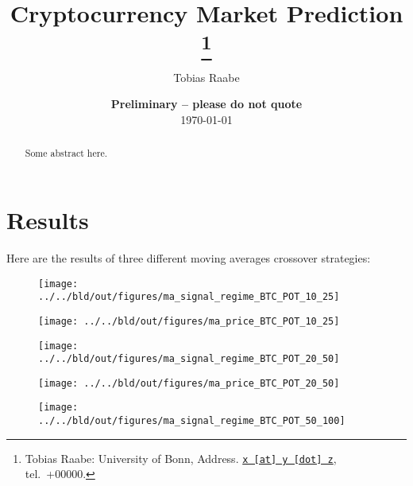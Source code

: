 \documentclass[11pt, a4paper, leqno]{article}
\begin{document}
\title{Cryptocurrency Market Prediction
\thanks{Tobias Raabe: University of Bonn, Address. \href{mailto:x@y.z} {\nolinkurl{x [at] y [dot] z}}, tel.~+00000.}
}

\author{Tobias Raabe
}

\date{
{\bf Preliminary -- please do not quote}
\\[1ex]
\today
}

\maketitle


\begin{abstract}
	Some abstract here.
\end{abstract}
\clearpage

\section{Results} %
\label{sec:results}

Here are the results of three different moving averages crossover strategies:

\begin{figure}[!ht]
    \centering
    \texttt{[image: ../../bld/out/figures/ma\_signal\_regime\_BTC\_POT\_10\_25]}
    \label{fig:figure1}
\end{figure}

\begin{figure}[!ht]
    \centering
    \texttt{[image: ../../bld/out/figures/ma\_price\_BTC\_POT\_10\_25]}
    \label{fig:figure2}
\end{figure}

\begin{figure}[!ht]
    \centering
    \texttt{[image: ../../bld/out/figures/ma\_signal\_regime\_BTC\_POT\_20\_50]}
    \label{fig:figure3}
\end{figure}

\begin{figure}[!ht]
    \centering
    \texttt{[image: ../../bld/out/figures/ma\_price\_BTC\_POT\_20\_50]}
    \label{fig:figure4}
\end{figure}

\begin{figure}[!ht]
    \centering
    \texttt{[image: ../../bld/out/figures/ma\_signal\_regime\_BTC\_POT\_50\_100]}
    \label{fig:figure5}
\end{figure}
\end{document}
